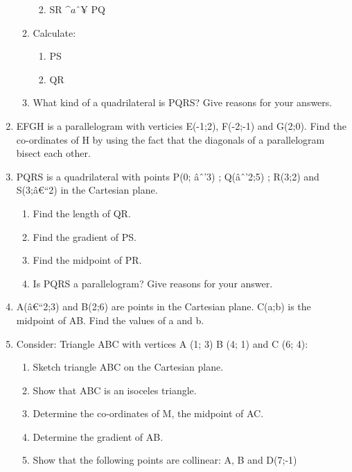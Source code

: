 \begin{enumerate}[noitemsep, label=\textbf{\arabic*}. ]
\begin{enumerate}[noitemsep, label=\textbf{\alph*}. ]
\begin{enumerate}[noitemsep, label=\textbf{\roman*}. ]
\label{m39167*uid63}\item SR $\^{a}ˆ¥$ PQ
\end{enumerate}
        \label{m39167*uid64}\item Calculate:
\label{m39167*id69993}\begin{enumerate}[noitemsep, label=\textbf{\roman*}. ] 
            \label{m39167*uid65}\item PS
\label{m39167*uid66}\item QR
\end{enumerate}
        \label{m39167*uid67}\item What kind of a quadrilateral is PQRS? Give reasons for your answers.
\end{enumerate}
                \label{m39167*uid68}\item EFGH is a parallelogram with verticies E(-1;2), F(-2;-1) and G(2;0). Find the co-ordinates of H by using the fact that the diagonals of a parallelogram bisect each other.\newline
\item  
PQRS is a quadrilateral with points P(0; \^{a}ˆ'3) ; Q(\^{a}ˆ'2;5) ; R(3;2) and S(3;\^{a}€``2)  in the Cartesian plane.
\label{m39167*id0812312}\begin{enumerate}[noitemsep, label=\textbf{\alph*}. ] 
            \label{m39167*id08123}\item Find the length of QR.\label{m39167*id981221}\item Find the gradient of PS.\label{m39167*id08213}\item Find the midpoint of PR.\label{m39167*id9871293}\item Is PQRS a parallelogram?  Give reasons for your answer. \end{enumerate}
                \item A(\^{a}€``2;3) and B(2;6) are points in the Cartesian plane.  C(a;b) is the midpoint of AB. Find the values of a and b.\newline
\item 
Consider: Triangle ABC with vertices A (1; 3) B (4; 1) and C (6; 4):
\label{m39167*id9173123}\begin{enumerate}[noitemsep, label=\textbf{\alph*}. ] 
            \item Sketch triangle ABC on the Cartesian plane. \item Show that ABC is an isoceles triangle.\item Determine the co-ordinates of M, the midpoint of AC.\item Determine the gradient of AB.\item Show that the following points are collinear: A, B and D(7;-1)\end{enumerate}

\end{enumerate}
